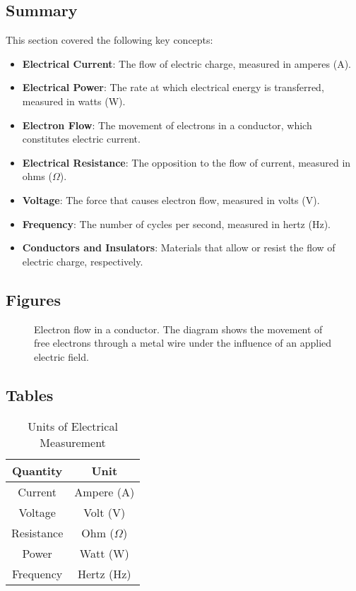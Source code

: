 
\subsection*{Summary}
This section covered the following key concepts:
\begin{itemize}
    \item \textbf{Electrical Current}: The flow of electric charge, measured in amperes (A).
    \item \textbf{Electrical Power}: The rate at which electrical energy is transferred, measured in watts (W).
    \item \textbf{Electron Flow}: The movement of electrons in a conductor, which constitutes electric current.
    \item \textbf{Electrical Resistance}: The opposition to the flow of current, measured in ohms (\(\Omega\)).
    \item \textbf{Voltage}: The force that causes electron flow, measured in volts (V).
    \item \textbf{Frequency}: The number of cycles per second, measured in hertz (Hz).
    \item \textbf{Conductors and Insulators}: Materials that allow or resist the flow of electric charge, respectively.
\end{itemize}

\subsection*{Figures}
\begin{figure}[h!]
    \centering
    \caption{Electron flow in a conductor. The diagram shows the movement of free electrons through a metal wire under the influence of an applied electric field.}
    \label{fig:electron_flow}
\end{figure}

\subsection*{Tables}
\begin{table}[h!]
    \centering
    \begin{tabular}{|c|c|}
        \hline
        \textbf{Quantity} & \textbf{Unit} \\
        \hline
        Current & Ampere (A) \\
        Voltage & Volt (V) \\
        Resistance & Ohm (\(\Omega\)) \\
        Power & Watt (W) \\
        Frequency & Hertz (Hz) \\
        \hline
    \end{tabular}
    \caption{Units of Electrical Measurement}
    \label{tab:electrical_units}
\end{table}
